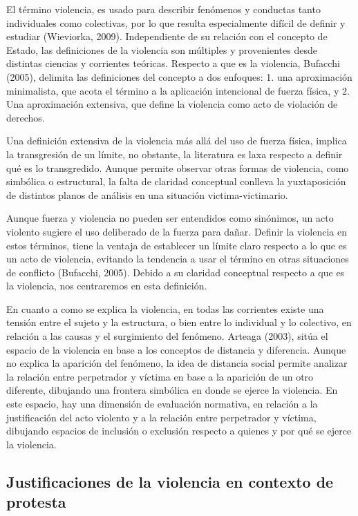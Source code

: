 \documentclass[12pt,twoside]{templates/facsothesis}
\begin{document}
El término violencia, es usado para describir fenómenos y conductas tanto individuales como colectivas, por lo que resulta especialmente difícil de definir y estudiar (Wieviorka, 2009). Independiente de su relación con el concepto de Estado, las definiciones de la violencia son múltiples y provenientes desde distintas ciencias y corrientes teóricas. Respecto a que es la violencia, Bufacchi (2005), delimita las definiciones del concepto a dos enfoques: 1. una aproximación minimalista, que acota el término a la aplicación intencional de fuerza física, y 2. Una aproximación extensiva, que define la violencia como acto de violación de derechos.

Una definición extensiva de la violencia más allá del uso de fuerza física, implica la transgresión de un límite, no obstante, la literatura es laxa respecto a definir qué es lo transgredido. Aunque permite observar otras formas de violencia, como simbólica o estructural, la falta de claridad conceptual conlleva la yuxtaposición de distintos planos de análisis en una situación victima-victimario.

Aunque fuerza y violencia no pueden ser entendidos como sinónimos, un acto violento sugiere el uso deliberado de la fuerza para dañar. Definir la violencia en estos términos, tiene la ventaja de establecer un límite claro respecto a lo que es un acto de violencia, evitando la tendencia a usar el término en otras situaciones de conflicto (Bufacchi, 2005). Debido a su claridad conceptual respecto a que es la violencia, nos centraremos en esta definición.

En cuanto a como se explica la violencia, en todas las corrientes existe una tensión entre el sujeto y la estructura, o bien entre lo individual y lo colectivo, en relación a las causas y el surgimiento del fenómeno. Arteaga (2003), sitúa el espacio de la violencia en base a los conceptos de distancia y diferencia. Aunque no explica la aparición del fenómeno, la idea de distancia social permite analizar la relación entre perpetrador y víctima en base a la aparición de un otro diferente, dibujando una frontera simbólica en donde se ejerce la violencia. En este espacio, hay una dimensión de evaluación normativa, en relación a la justificación del acto violento y a la relación entre perpetrador y víctima, dibujando espacios de inclusión o exclusión respecto a quienes y por qué se ejerce la violencia.

\hypertarget{justificaciones-de-la-violencia-en-contexto-de-protesta}{%
\subsection{Justificaciones de la violencia en contexto de protesta}\label{justificaciones-de-la-violencia-en-contexto-de-protesta}}
\end{document}
